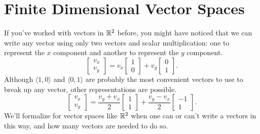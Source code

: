 \chapter{Finite Dimensional Vector Spaces}

If you've worked with vectors in $\mathbb{R}^2$ before, you might have noticed that we can write any vector using only two vectors and scalar multiplication: one to represent the $x$ component and another to represent the $y$ component.
\begin{equation*}
	\begin{bmatrix}
		v_x \\ v_y
	\end{bmatrix} = v_x \begin{bmatrix}
		1 \\ 0
	\end{bmatrix} + v_y \begin{bmatrix}
		0 \\ 1
	\end{bmatrix}.
\end{equation*}
Although $\langle 1, 0 \rangle$ and $\langle 0, 1 \rangle$ are probably the most convenient vectors to use to break up any vector, other representations are possible.
\begin{equation*}
	\begin{bmatrix}
		v_x \\ v_y
	\end{bmatrix} = \frac{v_y + v_x}{2} \begin{bmatrix}
		1 \\ 1
	\end{bmatrix} + \frac{v_y - v_x}{2} \begin{bmatrix}
		-1 \\ 1
	\end{bmatrix}.
\end{equation*}
We'll formalize for vector spaces like $\mathbb{R}^2$ when one can or can't write a vectors in this way, and how many vectors are needed to do so.




